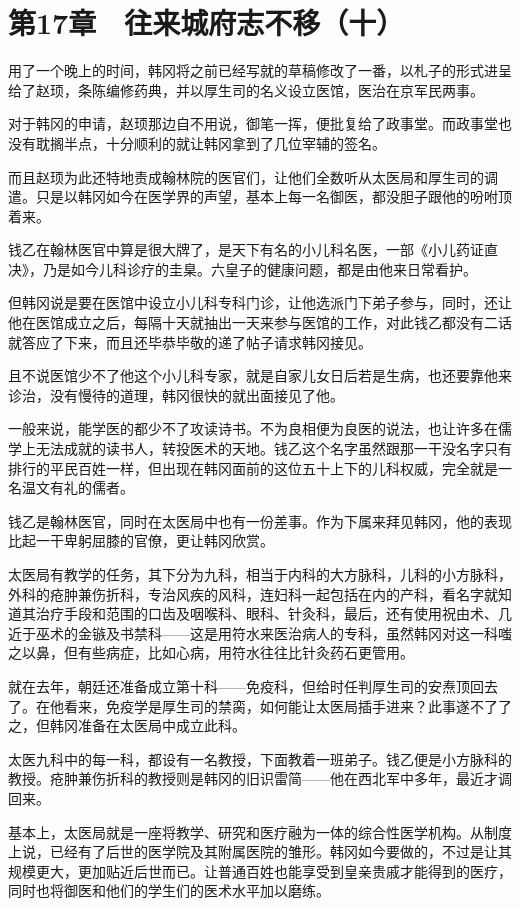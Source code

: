 \section{第17章　往来城府志不移（十）}

用了一个晚上的时间，韩冈将之前已经写就的草稿修改了一番，以札子的形式进呈给了赵顼，条陈编修药典，并以厚生司的名义设立医馆，医治在京军民两事。

对于韩冈的申请，赵顼那边自不用说，御笔一挥，便批复给了政事堂。而政事堂也没有耽搁半点，十分顺利的就让韩冈拿到了几位宰辅的签名。

而且赵顼为此还特地责成翰林院的医官们，让他们全数听从太医局和厚生司的调遣。只是以韩冈如今在医学界的声望，基本上每一名御医，都没胆子跟他的吩咐顶着来。

钱乙在翰林医官中算是很大牌了，是天下有名的小儿科名医，一部《小儿药证直决》，乃是如今儿科诊疗的圭臬。六皇子的健康问题，都是由他来日常看护。

但韩冈说是要在医馆中设立小儿科专科门诊，让他选派门下弟子参与，同时，还让他在医馆成立之后，每隔十天就抽出一天来参与医馆的工作，对此钱乙都没有二话就答应了下来，而且还毕恭毕敬的递了帖子请求韩冈接见。

且不说医馆少不了他这个小儿科专家，就是自家儿女日后若是生病，也还要靠他来诊治，没有慢待的道理，韩冈很快的就出面接见了他。

一般来说，能学医的都少不了攻读诗书。不为良相便为良医的说法，也让许多在儒学上无法成就的读书人，转投医术的天地。钱乙这个名字虽然跟那一干没名字只有排行的平民百姓一样，但出现在韩冈面前的这位五十上下的儿科权威，完全就是一名温文有礼的儒者。

钱乙是翰林医官，同时在太医局中也有一份差事。作为下属来拜见韩冈，他的表现比起一干卑躬屈膝的官僚，更让韩冈欣赏。

太医局有教学的任务，其下分为九科，相当于内科的大方脉科，儿科的小方脉科，外科的疮肿兼伤折科，专治风疾的风科，连妇科一起包括在内的产科，看名字就知道其治疗手段和范围的口齿及咽喉科、眼科、针灸科，最后，还有使用祝由术、几近于巫术的金镞及书禁科——这是用符水来医治病人的专科，虽然韩冈对这一科嗤之以鼻，但有些病症，比如心病，用符水往往比针灸药石更管用。

就在去年，朝廷还准备成立第十科——免疫科，但给时任判厚生司的安焘顶回去了。在他看来，免疫学是厚生司的禁脔，如何能让太医局插手进来？此事遂不了了之，但韩冈准备在太医局中成立此科。

太医九科中的每一科，都设有一名教授，下面教着一班弟子。钱乙便是小方脉科的教授。疮肿兼伤折科的教授则是韩冈的旧识雷简——他在西北军中多年，最近才调回来。

基本上，太医局就是一座将教学、研究和医疗融为一体的综合性医学机构。从制度上说，已经有了后世的医学院及其附属医院的雏形。韩冈如今要做的，不过是让其规模更大，更加贴近后世而已。让普通百姓也能享受到皇亲贵戚才能得到的医疗，同时也将御医和他们的学生们的医术水平加以磨练。

